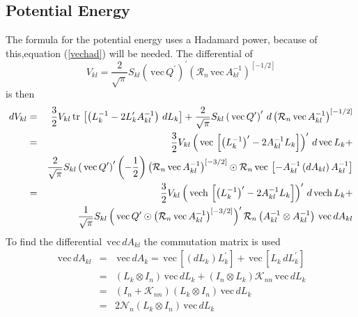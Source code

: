 \documentclass[12pt,thmsa,suthesis,verbatim]{report}
\begin{document}
\subsection{Potential Energy}

The formula for the potential energy uses a Hadamard power, because of
this,equation (\ref{vechad}) will be needed. The differential of 
\[
V_{kl}=\frac 2{\sqrt{\pi }}S_{kl}\left( \,\mathrm{vec}\,Q^{\prime }\right)
^{\prime }\left( \mathcal{R}_n\,\mathrm{vec}\,A_{kl}^{-1}\right) ^{\left[
-1/2\right] } 
\]
is then 
\begin{eqnarray}
dV_{kl} &=&\frac 32V_{kl}\,\mathrm{tr}\,\left[ \left( L_k^{-1}-2L_k^{\prime
}A_{kl}^{-1}\right) \,dL_k\right] +\frac 2{\sqrt{\pi }}S_{kl}\left( \,%
\mathrm{vec}\,Q^{\prime }\right) ^{\prime }\,d\left( \mathcal{R}_n\,\mathrm{%
vec}\,A_{kl}^{-1}\right) ^{\left[ -1/2\right] }  \nonumber \\
\ &=&\frac 32V_{kl}\left( \,\mathrm{vec}\,\left[ \left( L_k^{-1}\right)
^{\prime }-2A_{kl}^{-1}L_k\right] \right) ^{\prime }\,d\,\mathrm{vec}\,L_k+ 
\nonumber \\
&&\frac 2{\sqrt{\pi }}S_{kl}\left( \,\mathrm{vec}\,Q^{\prime }\right)
^{\prime }\left( -\frac 12\right) \left( \mathcal{R}_n\,\mathrm{vec}%
\,A_{kl}^{-1}\right) ^{\left[ -3/2\right] }\odot \mathcal{R}_n\,\mathrm{vec}%
\,\left[ -A_{kl}^{-1}\left( dA_{kl}\right) A_{kl}^{-1}\right]  \nonumber \\
\ &=&\frac 32V_{kl}\left( \,\mathrm{vech}\,\left[ \left( L_k^{-1}\right)
^{\prime }-2A_{kl}^{-1}L_k\right] \right) ^{\prime }\,d\,\mathrm{vech}\,L_k+
\nonumber \\
&&\frac 1{\sqrt{\pi }}S_{kl}\left( \,\mathrm{vec}\,Q^{\prime }\odot \left( 
\mathcal{R}_n\,\mathrm{vec}\,A_{kl}^{-1}\right) ^{\left[ -3/2\right]
}\right) ^{\prime }\mathcal{R}_n\left( A_{kl}^{-1}\otimes A_{kl}^{-1}\right)
\,\mathrm{vec}\,dA_{kl}  \label{dVkl1}
\end{eqnarray}
To find the differential $\,\mathrm{vec}\,dA_{kl}$ the commutation matrix is
used 
\begin{eqnarray}
\,\mathrm{vec}\,dA_{kl} &=&\,\mathrm{vec}\,dA_k=\,\mathrm{vec}\,\left[
\left( dL_k\right) L_k^{\prime }\right] +\,\mathrm{vec}\,\left[
L_k\,dL_k^{\prime }\right]  \nonumber \\
\ &=&\left( L_k\otimes I_n\right) \,\mathrm{vec}\,dL_k+\left( I_n\otimes
L_k\right) \mathcal{K}_{nn}\,\mathrm{vec}\,dL_k  \nonumber \\
\ &=&\left( I_n+\mathcal{K}_{nn}\right) \left( L_k\otimes I_n\right) \,%
\mathrm{vec}\,dL_k  \nonumber \\
\ &=&2\mathcal{N}_n\left( L_k\otimes I_n\right) \,\mathrm{vec}\,dL_k
\end{eqnarray}
\end{document}
